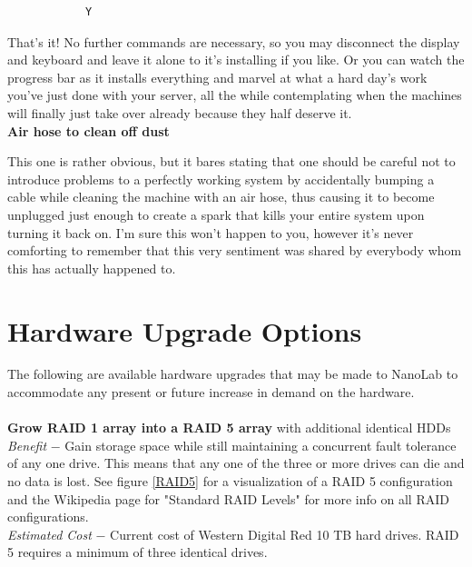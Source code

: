 \documentclass[titlepage]{article}
\begin{document}
        \begin{verbatim}
            Y
        \end{verbatim}
        
        That's it! No further commands are necessary, so you may disconnect the display and keyboard and leave it alone to it's installing if you like. Or you can watch the progress bar as it installs everything and marvel at what a hard day's work you've just done with your server, all the while contemplating when the machines will finally just take over already because they half deserve it.
    \\
    
    \noindent\textbf{Air hose to clean off dust}
    
        This one is rather obvious, but it bares stating that one should be careful not to introduce problems to a perfectly working system by accidentally bumping a cable while cleaning the machine with an air hose, thus causing it to become unplugged just enough to create a spark that kills your entire system upon turning it back on. I'm sure this won't happen to you, however it's never comforting to remember that this very sentiment was shared by everybody whom this has actually happened to. 

\section{Hardware Upgrade Options}

    The following are available hardware upgrades that may be made to NanoLab to accommodate any present or future increase in demand on the hardware.
    \\
    
    \noindent\makebox[\linewidth]{\rule{\textwidth}{0.4pt}}
    \\

    \noindent\textbf{Grow RAID 1 array into a RAID 5 array} with additional identical HDDs
    \\
    
    \noindent\textit{Benefit} $-$ Gain storage space while still maintaining a concurrent fault tolerance of any one drive. This means that any one of the three or more drives can die and no data is lost. See figure \ref{RAID5} for a visualization of a RAID 5 configuration and the Wikipedia page for "Standard RAID Levels" for more info on all RAID configurations.
    \\
    
    \noindent\textit{Estimated Cost} $-$ Current cost of Western Digital Red 10 TB hard drives. RAID 5 requires a minimum of three identical drives.
    \\
    
\end{document}
